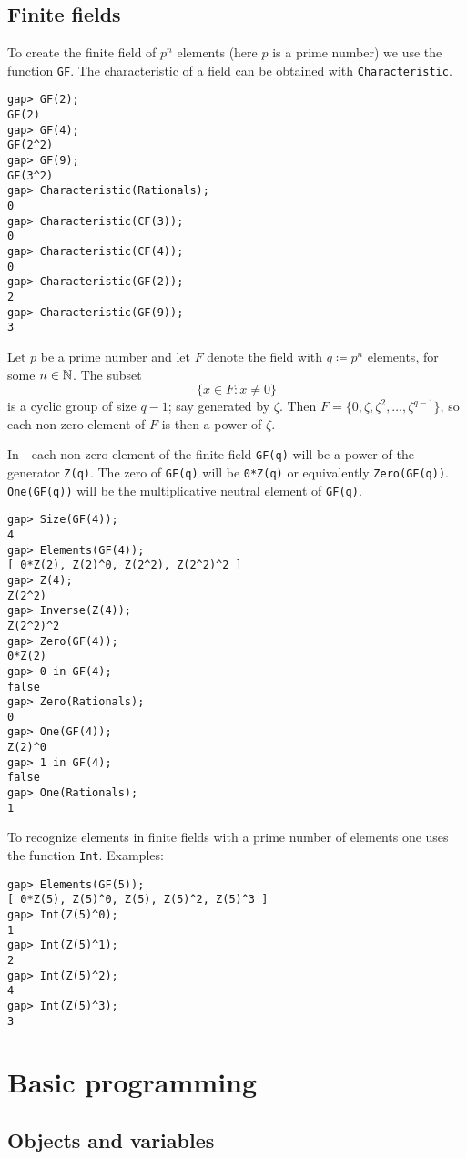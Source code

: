 \subsection*{Finite fields}
To create the finite field of $p^n$
elements (here $p$ is a prime number) we use the function \lstinline{GF}.  The
characteristic of a field can be obtained with \lstinline{Characteristic}. 
\begin{lstlisting}
gap> GF(2);                                                           
GF(2)
gap> GF(4);
GF(2^2)
gap> GF(9);
GF(3^2)
gap> Characteristic(Rationals);
0
gap> Characteristic(CF(3));
0
gap> Characteristic(CF(4));
0
gap> Characteristic(GF(2));
2
gap> Characteristic(GF(9));
3
\end{lstlisting}

Let $p$ be a prime number and let $F$ denote the field with $q\coloneqq p^n$ elements, for some $n\in\mathbb{N}$. 
The subset 
\[
  \{x\in F:x\ne 0\}
\]
is a cyclic group of size $q-1$; say generated by $\zeta$. Then
$F=\{0,\zeta,\zeta^2,\dots,\zeta^{q-1}\}$, so each non-zero element of $F$ is
then a power of $\zeta$.  

In~\GAP~each non-zero element of the finite field
\lstinline{GF(q)} will be a power of the generator \lstinline{Z(q)}. The zero
of \lstinline{GF(q)} will be \lstinline{0*Z(q)} or equivalently
\lstinline{Zero(GF(q))}. \lstinline{One(GF(q))} will be the multiplicative
neutral element of \lstinline{GF(q)}. 
\begin{lstlisting}
gap> Size(GF(4));
4
gap> Elements(GF(4));
[ 0*Z(2), Z(2)^0, Z(2^2), Z(2^2)^2 ]
gap> Z(4);
Z(2^2)
gap> Inverse(Z(4));
Z(2^2)^2
gap> Zero(GF(4));
0*Z(2)
gap> 0 in GF(4);
false
gap> Zero(Rationals);
0
gap> One(GF(4));
Z(2)^0
gap> 1 in GF(4);
false
gap> One(Rationals);
1
\end{lstlisting}

To recognize elements in finite fields with a prime number of elements one uses
the function \lstinline{Int}. Examples:
\begin{lstlisting}
gap> Elements(GF(5));
[ 0*Z(5), Z(5)^0, Z(5), Z(5)^2, Z(5)^3 ]
gap> Int(Z(5)^0);
1
gap> Int(Z(5)^1);
2
gap> Int(Z(5)^2);
4
gap> Int(Z(5)^3);
3
\end{lstlisting}

\section{Basic programming}
\label{programming}

\subsection*{Objects and variables}

